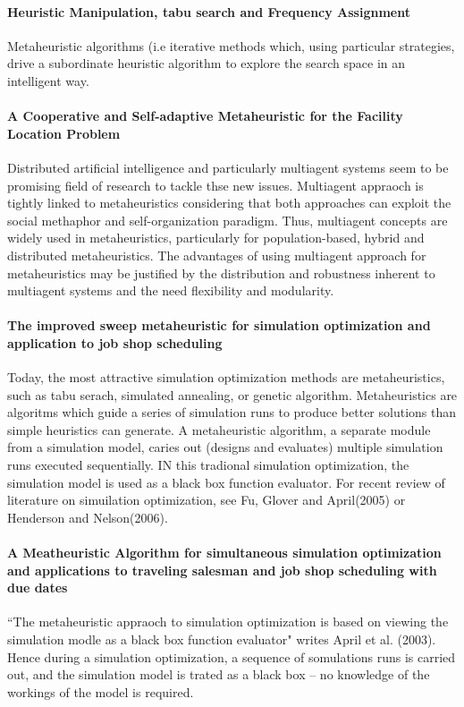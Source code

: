\paragraph{Heuristic Manipulation, tabu search and Frequency Assignment}
Metaheuristic algorithms (i.e iterative methods which, using particular strategies, drive a subordinate heuristic algorithm to explore the search space in an intelligent way.

\paragraph{A Cooperative and Self-adaptive Metaheuristic for the Facility Location Problem}
Distributed artificial intelligence and particularly multiagent systems seem to be promising field of research to tackle thse new issues. Multiagent appraoch  is tightly linked to metaheuristics considering that both approaches can exploit the social methaphor and self-organization paradigm. Thus, multiagent concepts are widely used in metaheuristics, particularly for population-based, hybrid and distributed metaheuristics. The advantages of using multiagent approach for metaheuristics may be justified by the distribution and robustness inherent to multiagent systems and the need flexibility and modularity.

\paragraph{The improved sweep metaheuristic for simulation optimization and application to job shop scheduling}
Today, the most attractive simulation optimization methods are metaheuristics, such as tabu serach, simulated annealing, or genetic algorithm. Metaheuristics are algoritms which guide a series of simulation runs to produce better solutions than simple heuristics can generate. A metaheuristic algorithm, a separate module from a simulation model, caries out (designs and evaluates) multiple simulation runs executed sequentially. IN this tradional simulation optimization, the simulation model is used as a black box function evaluator. For recent review of literature on simuilation optimization, see Fu, Glover and April(2005) or Henderson and Nelson(2006).

\paragraph{A Meatheuristic Algorithm for simultaneous simulation optimization and applications to traveling salesman and job shop scheduling with due dates}
``The metaheuristic appraoch to simulation optimization is based on viewing the simulation modle as a black box function evaluator" writes April et al. (2003). Hence during a simulation optimization, a sequence of somulations runs is carried out, and the simulation model is trated as a black box -- no knowledge of the workings of the model is required.

